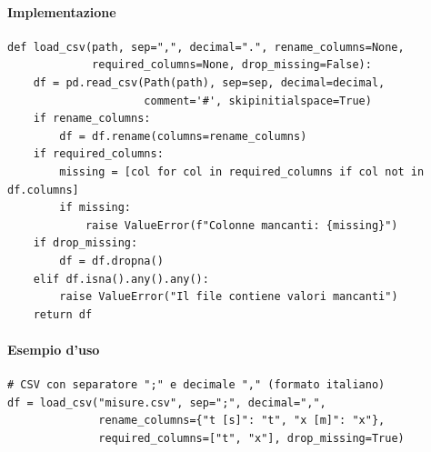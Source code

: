 \paragraph{Implementazione}
\begin{verbatim}
def load_csv(path, sep=",", decimal=".", rename_columns=None,
             required_columns=None, drop_missing=False):
    df = pd.read_csv(Path(path), sep=sep, decimal=decimal,
                     comment='#', skipinitialspace=True)
    if rename_columns:
        df = df.rename(columns=rename_columns)
    if required_columns:
        missing = [col for col in required_columns if col not in df.columns]
        if missing:
            raise ValueError(f"Colonne mancanti: {missing}")
    if drop_missing:
        df = df.dropna()
    elif df.isna().any().any():
        raise ValueError("Il file contiene valori mancanti")
    return df
\end{verbatim}
\vspace{-10pt}
\paragraph{Esempio d'uso}
\begin{verbatim}
# CSV con separatore ";" e decimale "," (formato italiano)
df = load_csv("misure.csv", sep=";", decimal=",",
              rename_columns={"t [s]": "t", "x [m]": "x"},
              required_columns=["t", "x"], drop_missing=True)
\end{verbatim}
